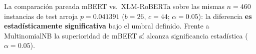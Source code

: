 La comparación pareada mBERT vs.\ XLM-RoBERTa sobre las mismas $n=460$ instancias de test arroja $p=0.041391$ ($b=26$, $c=44$; $\alpha=0.05$): la diferencia \textbf{es estadísticamente significativa} bajo el umbral definido. Frente a MultinomialNB la superioridad de mBERT sí alcanza significancia estadística ($\alpha=0.05$).
